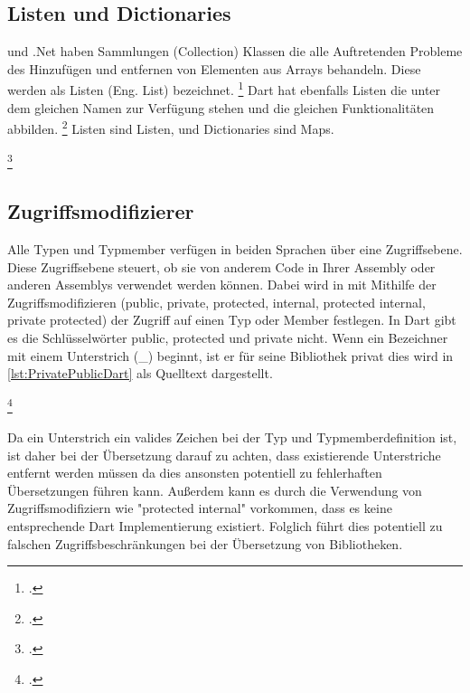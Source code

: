 \subsection{Listen und Dictionaries}
\Csharp und .Net haben Sammlungen (Collection) Klassen die alle Auftretenden Probleme des Hinzufügen und entfernen von Elementen aus Arrays behandeln.  Diese werden als Listen (Eng. List) bezeichnet. \footcite[Vgl.][S. 413]{Stellman2021} Dart hat ebenfalls Listen die unter dem gleichen Namen zur Verfügung stehen und die gleichen Funktionalitäten abbilden. \footcite[Vgl.][S. 12f ]{Meiller2020}
Listen sind Listen, und Dictionaries sind Maps.


\begin{minipage}{\linewidth}

\end{minipage}
\footcitetext[In Anlehnung an ][Abgerufen am \today]{Pedley2019}



\subsection{Zugriffsmodifizierer}

Alle Typen und Typmember verfügen in beiden Sprachen über eine Zugriffsebene.  Diese Zugriffsebene steuert, ob sie von anderem Code in Ihrer Assembly oder anderen Assemblys verwendet werden können.  Dabei wird in \Csharp mit Mithilfe der Zugriffsmodifizieren (public,  private,  protected,  internal,  protected internal,  private protected) der Zugriff auf einen Typ oder Member festlegen.  In Dart gibt es die Schlüsselwörter public,  protected und private nicht. Wenn ein Bezeichner mit einem Unterstrich (\_) beginnt, ist er für seine Bibliothek privat dies wird in \ref{lst:PrivatePublicDart} als Quelltext dargestellt. 

\begin{minipage}{\linewidth}

\end{minipage}
\footcitetext[In Anlehnung an ][Abgerufen am \today]{Pedley2019}

Da ein Unterstrich ein valides Zeichen bei der Typ und Typmemberdefinition ist, ist daher bei der Übersetzung darauf zu achten,  dass existierende Unterstriche entfernt werden müssen da dies ansonsten potentiell zu fehlerhaften Übersetzungen führen kann.  Außerdem kann es durch die Verwendung von Zugriffsmodifiziern wie "protected internal" vorkommen, dass es keine entsprechende Dart Implementierung existiert.  Folglich führt dies potentiell zu falschen Zugriffsbeschränkungen bei der Übersetzung von Bibliotheken. 


